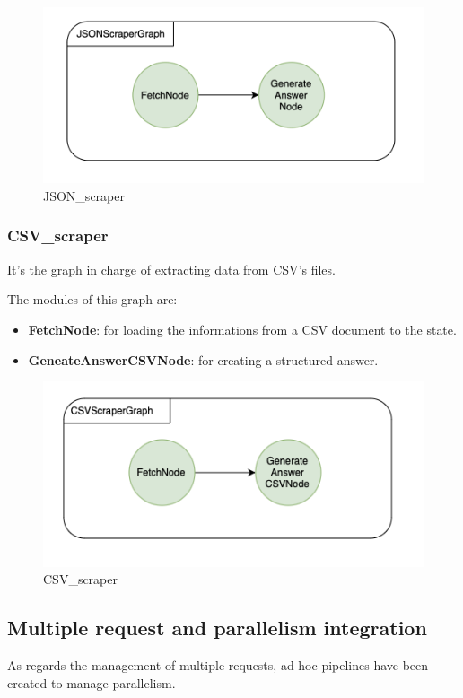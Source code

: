 \begin{figure}[H]
    \centering
    \includegraphics[width=0.75\linewidth]{Assets/json_scraper.png}
    \caption{JSON\_scraper}
    \label{fig:json_scraper}
\end{figure}
\subsubsection{CSV\_scraper}
It's the graph in charge of extracting data from CSV's files.

The modules of this graph are: 
\begin{itemize}
    \item \textbf{FetchNode}: for loading the informations from a CSV document to the state.
    \item \textbf{GeneateAnswerCSVNode}: for creating a structured answer.
\end{itemize}

\begin{figure}[H]
    \centering
    \includegraphics[width=0.75\linewidth]{Assets/csv_scraper.png}
    \caption{CSV\_scraper}
    \label{fig:csv-scraper}
\end{figure}
\subsection{Multiple request and parallelism integration}
As regards the management of multiple requests, ad hoc pipelines have been created to manage parallelism.

